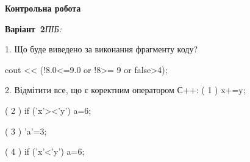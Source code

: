 \documentclass[11pt]{article}
\begin{document}
{\large\textbf{Контрольна робота}}

\textbf{Варіант \No\,2}\hfill \textit{ПІБ:}\,\underline{\hspace{60mm}}
\vspace{4mm}

1. Що буде виведено за виконання фрагменту коду?

cout << (!8.0<=9.0 or !8>= 9 or false>4);


2. %
Відмітити все, що є коректним оператором С++:
( 1 ) x+=y;

( 2 ) if ('x'><'y') a=6;

( 3 ) 'a'=3;

( 4 ) if ('x'<'y') a=6;


\newpage
\end{document}

